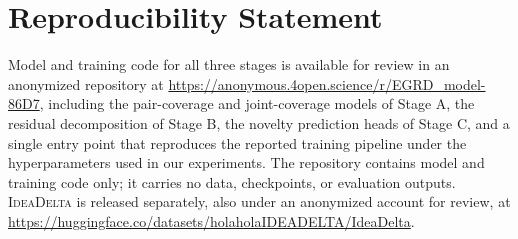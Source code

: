 \documentclass{article} %
\begin{document}
\section{Reproducibility Statement}
\label{app:reproducibility}
Model and training code for all three stages is available for review in an
anonymized repository at
\url{https://anonymous.4open.science/r/EGRD_model-86D7}, including the
pair-coverage and joint-coverage models of Stage A, the residual decomposition
of Stage B, the novelty prediction heads of Stage C, and a single entry point
that reproduces the reported training pipeline under the hyperparameters used
in our experiments. The repository contains model and training code only; it
carries no data, checkpoints, or evaluation outputs. \textsc{IdeaDelta} is
released separately, also under an anonymized account for review, at
\url{https://huggingface.co/datasets/holaholaIDEADELTA/IdeaDelta}.
\end{document}
